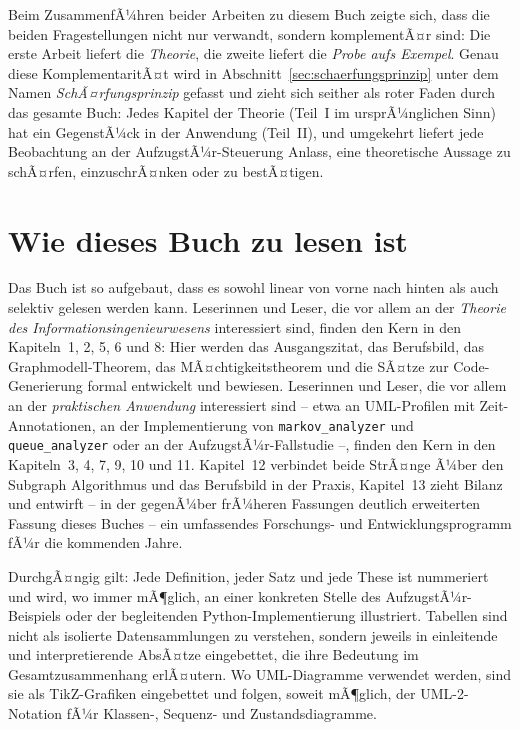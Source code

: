 ﻿\documentclass[a4paper,12pt]{report}
\theoremstyle{definition}
\begin{document}
Beim ZusammenfÃ¼hren beider Arbeiten zu diesem Buch zeigte sich, dass die
beiden Fragestellungen nicht nur verwandt, sondern komplementÃ¤r sind: Die
erste Arbeit liefert die \emph{Theorie}, die zweite liefert die
\emph{Probe aufs Exempel}. Genau diese KomplementaritÃ¤t wird in
Abschnitt~\ref{sec:schaerfungsprinzip} unter dem Namen
\emph{SchÃ¤rfungsprinzip} gefasst und zieht sich seither als roter Faden
durch das gesamte Buch: Jedes Kapitel der Theorie (Teil~I im ursprÃ¼nglichen
Sinn) hat ein GegenstÃ¼ck in der Anwendung (Teil~II), und umgekehrt liefert
jede Beobachtung an der AufzugstÃ¼r-Steuerung Anlass, eine theoretische
Aussage zu schÃ¤rfen, einzuschrÃ¤nken oder zu bestÃ¤tigen.

\section*{Wie dieses Buch zu lesen ist}

Das Buch ist so aufgebaut, dass es sowohl linear von vorne nach hinten als
auch selektiv gelesen werden kann. Leserinnen und Leser, die vor allem an
der \emph{Theorie des Informationsingenieurwesens} interessiert sind,
finden den Kern in den Kapiteln~1, 2, 5, 6 und 8: Hier werden das
Ausgangszitat, das Berufsbild, das Graphmodell-Theorem, das
MÃ¤chtigkeitstheorem und die SÃ¤tze zur Code-Generierung formal entwickelt
und bewiesen. Leserinnen und Leser, die vor allem an der \emph{praktischen
Anwendung} interessiert sind -- etwa an UML-Profilen mit
Zeit-Annotationen, an der Implementierung von \texttt{markov\_analyzer} und
\texttt{queue\_analyzer} oder an der AufzugstÃ¼r-Fallstudie --, finden den
Kern in den Kapiteln~3, 4, 7, 9, 10 und 11. Kapitel~12 verbindet beide
StrÃ¤nge Ã¼ber den Subgraph Algorithmus und das Berufsbild in der Praxis,
Kapitel~13 zieht Bilanz und entwirft -- in der gegenÃ¼ber frÃ¼heren Fassungen
deutlich erweiterten Fassung dieses Buches -- ein umfassendes Forschungs-
und Entwicklungsprogramm fÃ¼r die kommenden Jahre.

DurchgÃ¤ngig gilt: Jede Definition, jeder Satz und jede These ist nummeriert
und wird, wo immer mÃ¶glich, an einer konkreten Stelle des
AufzugstÃ¼r-Beispiels oder der begleitenden Python-Implementierung
illustriert. Tabellen sind nicht als isolierte Datensammlungen zu
verstehen, sondern jeweils in einleitende und interpretierende AbsÃ¤tze
eingebettet, die ihre Bedeutung im Gesamtzusammenhang erlÃ¤utern. Wo
UML-Diagramme verwendet werden, sind sie als TikZ-Grafiken eingebettet und
folgen, soweit mÃ¶glich, der UML-2-Notation fÃ¼r Klassen-, Sequenz- und
Zustandsdiagramme.
\end{document}
